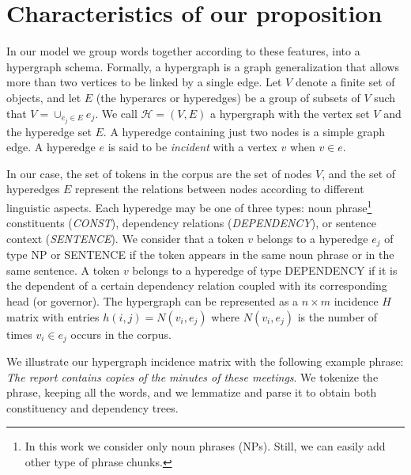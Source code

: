 \section{Characteristics of our proposition}
In our model we group words together according to these features, into a  hypergraph schema. Formally, a hypergraph \cite{Berge1985} is a graph generalization  that allows more than two vertices to be linked by a single edge. Let $V$ denote a finite set of objects, and let $E$  (the hyperarcs
or hyperedges) be a
group of subsets  of $V$ such that $V = \cup_{e_j \in E}e_j$. We call $\mathcal{H}=(V,E)$ a {hypergraph}
with the {vertex} set $V$ and the hyperedge set $E$. A
hyperedge containing just two nodes is a simple graph edge.
%
A hyperedge $e$ is said to be \emph{incident} with a vertex $v$ when
$v \in e$.


In our case, the set of tokens in the corpus are the set of nodes  $V$, and the set of hyperedges  $E$ represent the relations between nodes according to different linguistic aspects.
%
Each hyperedge may be one of three types: noun phrase\footnote{In this work we consider only noun phrases (NPs). Still, we can easily add other type of phrase chunks.}   constituents (\textit{CONST}), dependency relations (\textit{DEPENDENCY}), or sentence context (\textit{SENTENCE}). We consider that a token $v$ belongs to a hyperedge $e_j$ of type {NP} or {SENTENCE} if the token appears in the same noun phrase or in the same sentence. A token $v$ belongs to a hyperedge of type {DEPENDENCY} if it is the dependent of a certain dependency relation coupled with its corresponding head (or governor).	The hypergraph can be represented as a $n \times m$ incidence $H$ matrix with entries $h(i,j) = N(v_i, e_j)$ where $N(v_i, e_j)$ is the number of times $v_i \in e_j$ occurs in the corpus.


We illustrate our hypergraph incidence matrix with the following example  phrase: \textit{The report contains copies of the minutes of these meetings}. We tokenize the phrase, keeping all the words, and we lemmatize and parse it to obtain both constituency and dependency trees.

